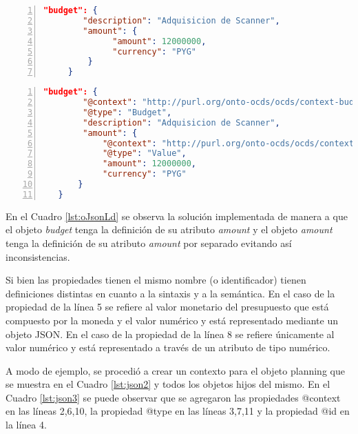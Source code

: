 \noindent\begin{minipage}{\textwidth}
\begin{lstlisting}[captionpos=b, caption=Objeto JSON con colisión semántica entre conceptos, label=lst:oJson,language=json,firstnumber=1,  numbers=left,  numberstyle=\tiny\color{mygray},frame=single]
    "budget": {
        "description": "Adquisicion de Scanner",
        "amount": {
              "amount": 12000000,
              "currency": "PYG"
         }
     }  
    \end{lstlisting}
\end{minipage}
\noindent
\begin{minipage}{\textwidth}
    \begin{lstlisting}[captionpos=b, caption=Objeto JSON-LD sin colisión semántica entre conceptos , label=lst:oJsonLd, language=json,firstnumber=1,  numbers=left,  numberstyle=\tiny\color{mygray},frame=single]
    "budget": {
        "@context": "http://purl.org/onto-ocds/ocds/context-budget.json",
        "@type": "Budget",
        "description": "Adquisicion de Scanner",
        "amount": {
            "@context": "http://purl.org/onto-ocds/ocds/context-value.json",
            "@type": "Value",
            "amount": 12000000,
            "currency": "PYG"
       }
   }   
        \end{lstlisting}
    \end{minipage}

En el Cuadro \ref{lst:oJsonLd} se observa la solución implementada de manera a que el objeto \textit{budget} tenga la definición de su atributo \textit{amount} y el objeto \textit{amount} tenga la definición de su atributo \textit{amount} por separado evitando así inconsistencias.

Si bien las propiedades tienen el mismo nombre (o identificador) tienen definiciones distintas en cuanto a la sintaxis y a la semántica. En el caso de la propiedad de la línea 5 se refiere al valor monetario del presupuesto que está compuesto por la moneda y el valor numérico y está representado mediante un objeto JSON. En el caso de la propiedad de la línea 8 se refiere únicamente al valor numérico y está representado a través de un atributo de tipo numérico. 


A modo de ejemplo, se procedió a crear un contexto para el objeto planning que se muestra en el Cuadro \ref{lst:json2} y todos los objetos hijos del mismo. En el Cuadro \ref{lst:json3} se puede observar que se agregaron las propiedades @context en las líneas 2,6,10, la propiedad @type en las líneas 3,7,11 y la propiedad @id en la línea 4.

